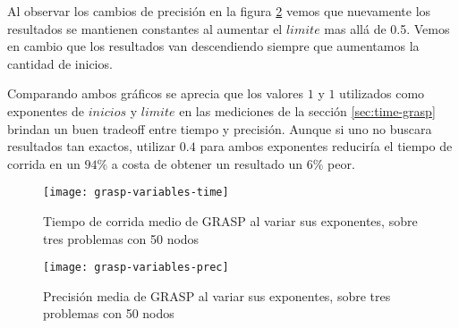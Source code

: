Al observar los cambios de precisión en la figura \ref{fig:grasp-variables-prec} vemos que nuevamente los resultados se mantienen constantes
al aumentar el $limite$ mas allá de 0.5. Vemos en cambio que los resultados van descendiendo siempre que aumentamos
la cantidad de inicios.

Comparando ambos gráficos se aprecia que los valores $1$ y $1$ utilizados como exponentes de $inicios$ y $limite$ en las mediciones
de la sección \ref{sec:time-grasp} brindan un buen tradeoff entre tiempo y precisión. Aunque si uno no buscara resultados tan exactos,
utilizar $0.4$ para ambos exponentes reduciría el tiempo de corrida en un $94\%$ a costa de obtener un resultado un $6\%$ peor.

\begin{figure}[H]
    \centering
    \texttt{[image: grasp-variables-time]}
    \caption{Tiempo de corrida medio de GRASP al variar sus exponentes, sobre tres problemas con 50 nodos}
    \label{fig:grasp-variables-time}
\end{figure}

\begin{figure}[H]
    \centering
    \texttt{[image: grasp-variables-prec]}
    \caption{Precisión media de GRASP al variar sus exponentes, sobre tres problemas con 50 nodos}
    \label{fig:grasp-variables-prec}
\end{figure}

